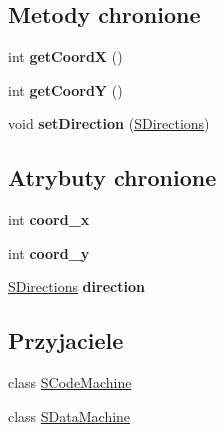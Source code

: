 \subsection*{Metody chronione}
\begin{CompactItemize}
\item 
\hypertarget{classSAbstractPointer_0e44b215ff78c8315a4fc4dc12cd4049}{
int \textbf{getCoordX} ()}
\label{classSAbstractPointer_0e44b215ff78c8315a4fc4dc12cd4049}

\item 
\hypertarget{classSAbstractPointer_0226e83b6f838f3ee8491915b9ebab74}{
int \textbf{getCoordY} ()}
\label{classSAbstractPointer_0226e83b6f838f3ee8491915b9ebab74}

\item 
\hypertarget{classSAbstractPointer_e1b27cb6a14cbf77e4499d8ca1ae7c90}{
void \textbf{setDirection} (\hyperlink{senums_8h_039d4115103dc22e0555ecc968fecbf0}{SDirections})}
\label{classSAbstractPointer_e1b27cb6a14cbf77e4499d8ca1ae7c90}

\end{CompactItemize}
\subsection*{Atrybuty chronione}
\begin{CompactItemize}
\item 
\hypertarget{classSAbstractPointer_f4a22efc5fe4922cfe61ac8d849d6849}{
int \textbf{coord\_\-x}}
\label{classSAbstractPointer_f4a22efc5fe4922cfe61ac8d849d6849}

\item 
\hypertarget{classSAbstractPointer_8804aa2589dc17c401c438a2f4a1c489}{
int \textbf{coord\_\-y}}
\label{classSAbstractPointer_8804aa2589dc17c401c438a2f4a1c489}

\item 
\hypertarget{classSAbstractPointer_6e8b50c6806f43a8b29596c8899db4f2}{
\hyperlink{senums_8h_039d4115103dc22e0555ecc968fecbf0}{SDirections} \textbf{direction}}
\label{classSAbstractPointer_6e8b50c6806f43a8b29596c8899db4f2}

\end{CompactItemize}
\subsection*{Przyjaciele}
\begin{CompactItemize}
\item 
\hypertarget{classSAbstractPointer_13f503f5e1b3625e973ac350880b3a31}{
class \hyperlink{classSAbstractPointer_13f503f5e1b3625e973ac350880b3a31}{SCodeMachine}}
\label{classSAbstractPointer_13f503f5e1b3625e973ac350880b3a31}

\item 
\hypertarget{classSAbstractPointer_b064517f75c184bae39efba1df818a12}{
class \hyperlink{classSAbstractPointer_b064517f75c184bae39efba1df818a12}{SDataMachine}}
\label{classSAbstractPointer_b064517f75c184bae39efba1df818a12}

\end{CompactItemize}


